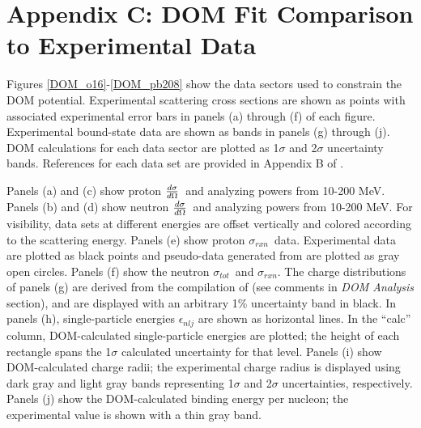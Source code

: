\documentclass[twocolumn,secnumarabic,amssymb, nobibnotes, aps, prl,
superscriptaddress, nobalancelastpage, floatfix]{revtex4}
\newcommand{\tot}{\ensuremath{\sigma_{tot}}}
\newcommand{\rxn}{\ensuremath{\sigma_{rxn}}}
\newcommand{\el}{\ensuremath{\frac{\lowercase{d}\sigma}{\lowercase{d}\Omega}}}
\begin{document}
{\section{Appendix C: DOM Fit Comparison to Experimental Data}
Figures \ref{DOM_o16}-\ref{DOM_pb208} show the data sectors used to constrain the DOM potential.
Experimental scattering cross sections are shown as points with associated experimental error bars
in panels (a) through (f) of each figure. Experimental bound-state data are shown as bands in panels 
(g) through (j). DOM calculations for each data sector are plotted as 1$\sigma$ and 2$\sigma$ 
uncertainty bands. References for each data set are provided in Appendix B of \cite{PruittPhDThesis}.

Panels (a) and (c) show proton \el\ and analyzing powers from 10-200 MeV.
Panels (b) and (d) show neutron \el\ and analyzing powers from 10-200 MeV.
For visibility, data sets at different energies are offset vertically and
colored according to the scattering energy. Panels (e) show proton \rxn\ data. Experimental data
are plotted as black points and pseudo-data generated from \cite{Carlson1996} are plotted as gray 
open circles. Panels (f) show the neutron \tot\ and \rxn. The charge distributions of panels (g) are 
derived from the compilation of \cite{DeVries1987} (see comments in \textit{DOM Analysis} section), and 
are displayed with an arbitrary 1\% uncertainty band in black.
In panels (h), single-particle energies $\epsilon_{nlj}$ are shown as
horizontal lines. In the ``calc'' column, DOM-calculated single-particle energies are plotted; the
height of each rectangle spans the 1$\sigma$ calculated uncertainty for that level. Panels (i)
show DOM-calculated charge radii; the experimental charge radius is displayed
using dark gray and light gray bands representing 1$\sigma$ and 2$\sigma$ uncertainties,
respectively. Panels (j) show the DOM-calculated binding energy per nucleon; the experimental value is shown with a thin gray band.

}
\end{document}
